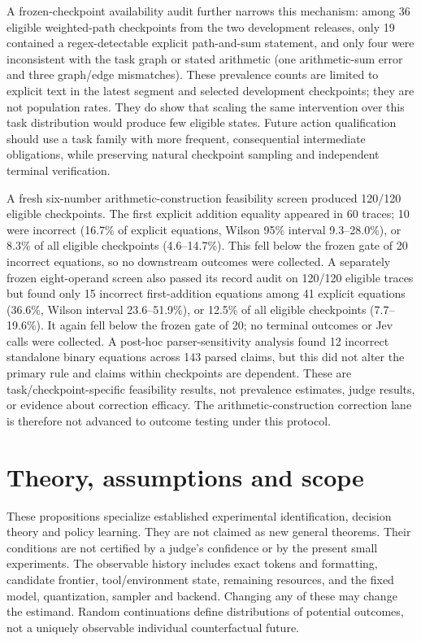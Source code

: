 \documentclass[11pt]{article}
\begin{document}
A frozen-checkpoint availability audit further narrows this mechanism: among 36 eligible weighted-path checkpoints from the two development releases, only 19 contained a regex-detectable explicit path-and-sum statement, and only four were inconsistent with the task graph or stated arithmetic (one arithmetic-sum error and three graph/edge mismatches). These prevalence counts are limited to explicit text in the latest segment and selected development checkpoints; they are not population rates. They do show that scaling the same intervention over this task distribution would produce few eligible states. Future action qualification should use a task family with more frequent, consequential intermediate obligations, while preserving natural checkpoint sampling and independent terminal verification.

A fresh six-number arithmetic-construction feasibility screen produced 120/120 eligible checkpoints. The first explicit addition equality appeared in 60 traces; 10 were incorrect (16.7\% of explicit equations, Wilson 95\% interval 9.3--28.0\%), or 8.3\% of all eligible checkpoints (4.6--14.7\%). This fell below the frozen gate of 20 incorrect equations, so no downstream outcomes were collected. A separately frozen eight-operand screen also passed its record audit on 120/120 eligible traces but found only 15 incorrect first-addition equations among 41 explicit equations (36.6\%, Wilson interval 23.6--51.9\%), or 12.5\% of all eligible checkpoints (7.7--19.6\%). It again fell below the frozen gate of 20; no terminal outcomes or Jev calls were collected. A post-hoc parser-sensitivity analysis found 12 incorrect standalone binary equations across 143 parsed claims, but this did not alter the primary rule and claims within checkpoints are dependent. These are task/checkpoint-specific feasibility results, not prevalence estimates, judge results, or evidence about correction efficacy. The arithmetic-construction correction lane is therefore not advanced to outcome testing under this protocol.

\appendix
\section{Theory, assumptions and scope}
These propositions specialize established experimental identification, decision theory and policy learning. They are not claimed as new general theorems. Their conditions are not certified by a judge's confidence or by the present small experiments. The observable history includes exact tokens and formatting, candidate frontier, tool/environment state, remaining resources, and the fixed model, quantization, sampler and backend. Changing any of these may change the estimand. Random continuations define distributions of potential outcomes, not a uniquely observable individual counterfactual future.
\end{document}
